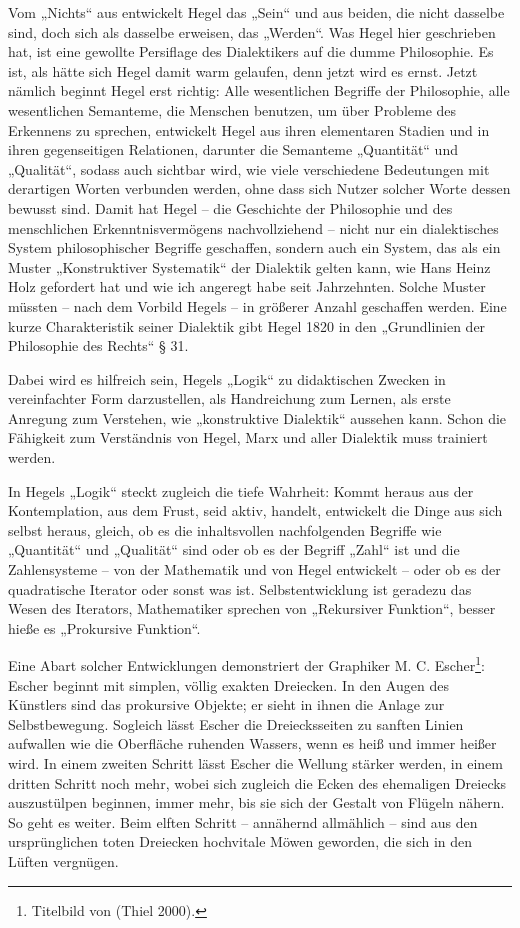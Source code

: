 \documentclass[11pt,a4paper]{article}
\begin{document}
Vom „Nichts“ aus entwickelt Hegel das „Sein“ und aus beiden, die nicht
dasselbe sind, doch sich als dasselbe erweisen, das „Werden“. Was Hegel hier
geschrieben hat, ist eine gewollte Persiflage des Dialektikers auf die dumme
Philosophie. Es ist, als hätte sich Hegel damit warm gelaufen, denn jetzt wird
es ernst. Jetzt nämlich beginnt Hegel erst richtig: Alle wesentlichen Begriffe
der Philosophie, alle wesentlichen Semanteme, die Menschen benutzen, um über
Probleme des Erkennens zu sprechen, entwickelt Hegel aus ihren elementaren
Stadien und in ihren gegenseitigen Relationen, darunter die Semanteme
„Quantität“ und „Qualität“, sodass auch sichtbar wird, wie viele verschiedene
Bedeutungen mit derartigen Worten verbunden werden, ohne dass sich Nutzer
solcher Worte dessen bewusst sind. Damit hat Hegel – die Geschichte der
Philosophie und des menschlichen Erkenntnisvermögens nachvollziehend -- nicht
nur ein dialektisches System philosophischer Begriffe geschaffen, sondern auch
ein System, das als ein Muster „Konstruktiver Systematik“ der Dialektik gelten
kann, wie Hans Heinz Holz gefordert hat und wie ich angeregt habe seit
Jahrzehnten. Solche Muster müssten – nach dem Vorbild Hegels – in größerer
Anzahl geschaffen werden. Eine kurze Charakteristik seiner Dialektik gibt
Hegel 1820 in den „Grundlinien der Philosophie des Rechts“ § 31.

Dabei wird es hilfreich sein, Hegels „Logik“ zu didaktischen Zwecken in
vereinfachter Form darzustellen, als Handreichung zum Lernen, als erste
Anregung zum Verstehen, wie „konstruktive Dialektik“ aussehen kann. Schon die
Fähigkeit zum Verständnis von Hegel, Marx und aller Dialektik muss trainiert
werden.

In Hegels „Logik“ steckt zugleich die tiefe Wahrheit: Kommt heraus aus der
Kontemplation, aus dem Frust, seid aktiv, handelt, entwickelt die Dinge aus
sich selbst heraus, gleich, ob es die inhaltsvollen nachfolgenden Begriffe wie
„Quantität“ und „Qualität“ sind oder ob es der Begriff „Zahl“ ist und die
Zahlensysteme – von der Mathematik und von Hegel entwickelt -- oder ob es der
quadratische Iterator oder sonst was ist. Selbstentwicklung ist geradezu das
Wesen des Iterators, Mathematiker sprechen von „Rekursiver Funktion“, besser
hieße es „Prokursive Funktion“.

Eine Abart solcher Entwicklungen demonstriert der Graphiker
M. C. Escher\footnote{Titelbild von (Thiel 2000).}: Escher beginnt mit
simplen, völlig exakten Dreiecken. In den Augen des Künstlers sind das
prokursive Objekte; er sieht in ihnen die Anlage zur Selbstbewegung. Sogleich
lässt Escher die Dreiecksseiten zu sanften Linien aufwallen wie die Oberfläche
ruhenden Wassers, wenn es heiß und immer heißer wird. In einem zweiten Schritt
lässt Escher die Wellung stärker werden, in einem dritten Schritt noch mehr,
wobei sich zugleich die Ecken des ehemaligen Dreiecks auszustülpen beginnen,
immer mehr, bis sie sich der Gestalt von Flügeln nähern. So geht es weiter.
Beim elften Schritt – annähernd allmählich -- sind aus den ursprünglichen
toten Dreiecken hochvitale Möwen geworden, die sich in den Lüften vergnügen.
\end{document}
